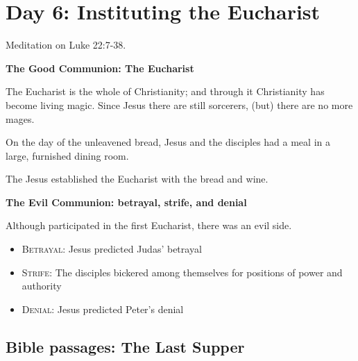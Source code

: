 \section{Day 6: Instituting the Eucharist}

Meditation on Luke 22:7-38.

\textbf{The Good Communion: The Eucharist}

\begin{quotex}
The Eucharist is the whole of Christianity; and through it Christianity has become living magic. Since Jesus there are still sorcerers, (but) there are no more mages. 

\end{quotex}

On the day of the unleavened bread, Jesus and the disciples had a meal in a large, furnished dining room.

The Jesus established the Eucharist with the bread and wine.

\textbf{The Evil Communion: betrayal, strife, and denial}

Although participated in the first Eucharist, there was an evil side.

\begin{itemize}
\item \textsc{Betrayal}: Jesus predicted Judas' betrayal 
\item \textsc{Strife}: The disciples bickered among themselves for positions of power and authority 
\item \textsc{Denial}: Jesus predicted Peter's denial 
\end{itemize}

\subsection{Bible passages: The Last Supper}

